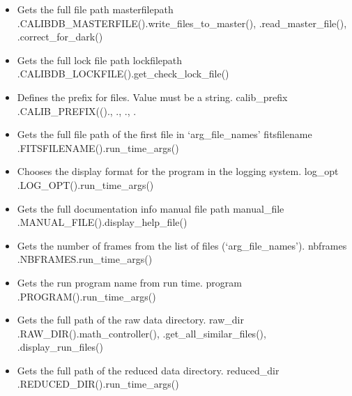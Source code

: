 \begin{itemize}
\item {}
{Gets the full \calibdb file path}
{masterfilepath}
{\AllRecipes}{\spirouConst.CALIBDB\_MASTERFILE()}{\spirouCDB.write\_files\_to\_master(), \spirouCDB.read\_master\_file(), \spirouImage.correct\_for\_dark()}


\item {}
{Gets the full \calibdb lock file path}
{lockfilepath}
{\AllRecipes}{\spirouConst.CALIBDB\_LOCKFILE()}{\spirouCDB.get\_check\_lock\_file()}


\item {}
{Defines the prefix for \calibdb files. Value must be a string.}
{calib\_prefix}
{\AllRecipes}{\spirouConst.CALIB\_PREFIX(()}{\calDARK.\progMAIN, \callocRAW.\progMAIN, \calSLIT.\progMAIN, \calFFraw.\progMAIN}


\item {}
{Gets the full file path of the first file in `arg\_file\_names'}
{fitsfilename}
{\AllRecipes}{\spirouConst.FITSFILENAME()}{\spirouStartup.run\_time\_args()}


\item {}
{Chooses the display format for the program in the logging system.}
{log\_opt}
{\AllRecipes}{\spirouConst.LOG\_OPT()}{\spirouStartup.run\_time\_args()}


\item {}
{Gets the full documentation info manual file path}
{manual\_file}
{\AllRecipes}{\spirouConst.MANUAL\_FILE()}{\spirouStartup.display\_help\_file()}


\item {}
{Gets the number of frames from the list of files (`arg\_file\_names').}
{nbframes}
{\AllRecipes}{\spirouConst.NBFRAMES}{\spirouStartup.run\_time\_args()}


\item {}
{Gets the run program name from run time.}
{program}
{\AllRecipes}{\spirouConst.PROGRAM()}{\spirouStartup.run\_time\_args()}


\item {}
{Gets the full path of the raw data directory.}
{raw\_dir}
{\AllRecipes}{\spirouConst.RAW\_DIR()}{\spirouFITS.math\_controller(), \spirouImage.get\_all\_similar\_files(), \spirouStartup.display\_run\_files()}


\item {} 
{Gets the full path of the reduced data directory.}
{reduced\_dir}
{\AllRecipes}{\spirouConst.REDUCED\_DIR()}{\spirouStartup.run\_time\_args()}

\end{itemize}

